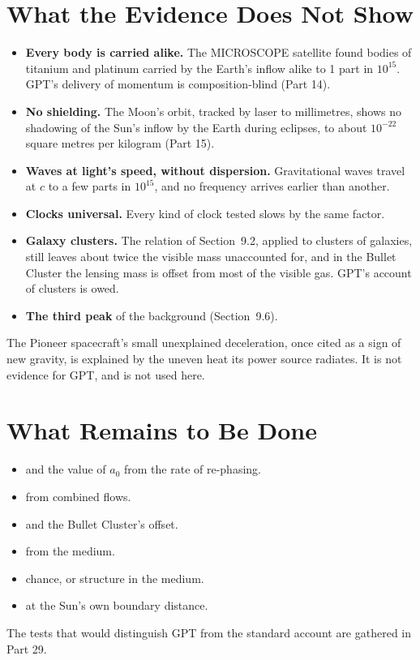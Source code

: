 \section{What the Evidence Does Not Show}

\begin{itemize}
\item \textbf{Every body is carried alike.} The MICROSCOPE satellite found bodies of titanium and platinum carried by the Earth's inflow alike to 1 part in $10^{15}$. GPT's delivery of momentum is composition-blind (Part 14).
\item \textbf{No shielding.} The Moon's orbit, tracked by laser to millimetres, shows no shadowing of the Sun's inflow by the Earth during eclipses, to about $10^{-22}$ square metres per kilogram (Part 15).
\item \textbf{Waves at light's speed, without dispersion.} Gravitational waves travel at $c$ to a few parts in $10^{15}$, and no frequency arrives earlier than another.
\item \textbf{Clocks universal.} Every kind of clock tested slows by the same factor.
\item \textbf{Galaxy clusters.} The relation of Section~9.2, applied to clusters of galaxies, still leaves about twice the visible mass unaccounted for, and in the Bullet Cluster the lensing mass is offset from most of the visible gas. GPT's account of clusters is owed.
\item \textbf{The third peak} of the background (Section~9.6).
\end{itemize}

 The Pioneer spacecraft's small unexplained deceleration, once cited as a sign of new gravity, is explained by the uneven heat its power source radiates. It is not evidence for GPT, and is not used here.

\section{What Remains to Be Done}

\begin{itemize}
\item {} and the value of $a_0$ from the rate of re-phasing.
\item {} from combined flows.
\item {} and the Bullet Cluster's offset.
\item {} from the medium.
\item {} chance, or structure in the medium.
\item {} at the Sun's own boundary distance.
\end{itemize}
The tests that would distinguish GPT from the standard account are gathered in Part 29.

